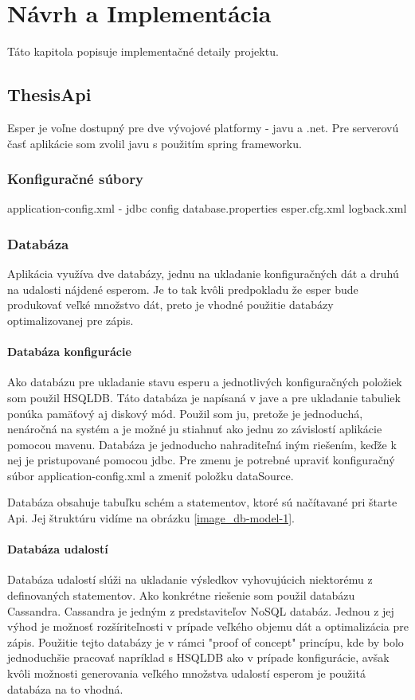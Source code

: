 \chapter{Návrh a Implementácia}
Táto kapitola popisuje implementačné detaily projektu. 

\section{ThesisApi}
	Esper je voľne dostupný pre dve vývojové platformy - javu a .net. Pre serverovú časť aplikácie som zvolil javu s použitím spring frameworku.
	\subsection{Konfiguračné súbory}
		application-config.xml - jdbc config
		database.properties
		esper.cfg.xml
		logback.xml
	\subsection{Databáza}
		Aplikácia využíva dve databázy, jednu na ukladanie konfiguračných dát a druhú na udalosti nájdené esperom. Je to tak kvôli predpokladu že esper bude produkovať veľké množstvo dát, preto je vhodné použitie databázy optimalizovanej pre zápis.
	
		\subsubsection{Databáza konfigurácie}
		Ako databázu pre ukladanie stavu esperu a jednotlivých konfiguračných položiek som použil \ac{HSQLDB}. Táto databáza je napísaná v jave a pre ukladanie tabuliek ponúka pamäťový aj diskový mód. Použil som ju, pretože je jednoduchá, nenáročná na systém a je možné ju stiahnuť ako jednu zo závislostí aplikácie pomocou mavenu. Databáza je jednoducho nahraditeľná iným riešením, keďže k nej je pristupované pomocou jdbc. Pre zmenu je potrebné upraviť konfiguračný súbor application-config.xml a zmeniť položku dataSource.
		
		Databáza obsahuje tabuľku schém a statementov, ktoré sú načítavané pri štarte Api. Jej štruktúru vidíme na obrázku \ref{image_db-model-1}.
			
		\subsubsection{Databáza udalostí}
		Databáza udalostí slúži na ukladanie výsledkov vyhovujúcich niektorému z definovaných statementov. Ako konkrétne riešenie som použil databázu Cassandra. Cassandra je jedným z predstaviteľov NoSQL databáz. Jednou z jej výhod je možnosť rozšíriteľnosti v prípade veľkého objemu dát a optimalizácia pre zápis. Použitie tejto databázy je v rámci "proof of concept" princípu, kde by bolo jednoduchšie pracovať napríklad s HSQLDB ako v prípade konfigurácie, avšak kvôli možnosti generovania veľkého množstva udalostí esperom je použitá databáza na to vhodná.
	
